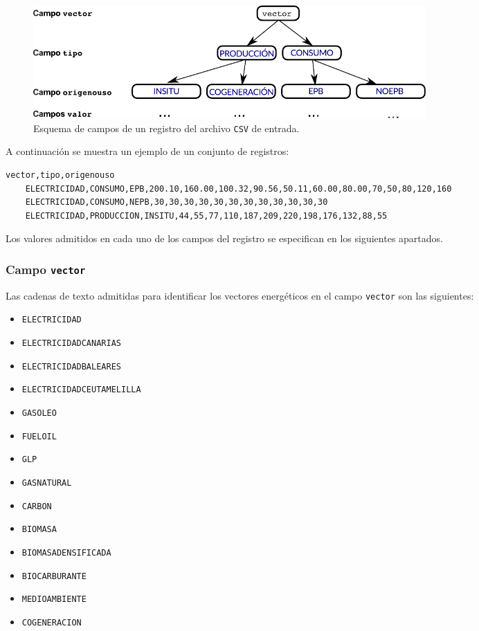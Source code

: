 \documentclass[10pt,notitlepage,oneside,a4paper]{article}
\begin{document}
\begin{figure}[H]
\centering
\includegraphics[width=15cm]{esquemavectores}
\caption{Esquema de campos de un registro del archivo \texttt{CSV} de entrada.}
\label{fig:estructuraVectores}
\end{figure}

A continuación se muestra un ejemplo de un conjunto de registros:

\begin{Verbatim}[fontsize=\small,frame=single]
    vector,tipo,origenouso
    ELECTRICIDAD,CONSUMO,EPB,200.10,160.00,100.32,90.56,50.11,60.00,80.00,70,50,80,120,160
    ELECTRICIDAD,CONSUMO,NEPB,30,30,30,30,30,30,30,30,30,30,30,30
    ELECTRICIDAD,PRODUCCION,INSITU,44,55,77,110,187,209,220,198,176,132,88,55
\end{Verbatim}

Los valores admitidos en cada uno de los campos del registro se especifican en los siguientes apartados.

\subsubsection{Campo \texttt{vector}}

Las cadenas de texto admitidas para identificar los vectores energéticos en el campo \texttt{vector} son las siguientes:

\begin{multicols}{3}
\begin{itemize}
\item \texttt{ELECTRICIDAD}
\item \texttt{ELECTRICIDADCANARIAS}
\item \texttt{ELECTRICIDADBALEARES}
\item \texttt{ELECTRICIDADCEUTAMELILLA}
\item \texttt{GASOLEO}
\item \texttt{FUELOIL}
\item \texttt{GLP}
\item \texttt{GASNATURAL}
\item \texttt{CARBON}
\item \texttt{BIOMASA}
\item \texttt{BIOMASADENSIFICADA}
\item \texttt{BIOCARBURANTE}
\item \texttt{MEDIOAMBIENTE}
\item \texttt{COGENERACION}
\end{itemize}
\end{multicols}
\end{document}
